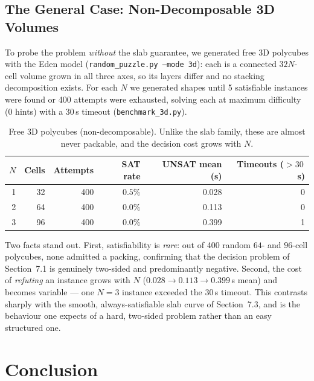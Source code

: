 \documentclass[12pt,a4paper]{article}
\begin{document}
\subsection{The General Case: Non-Decomposable 3D Volumes}

To probe the problem \emph{without} the slab guarantee, we generated free 3D
polycubes with the Eden model (\texttt{random\_puzzle.py --mode 3d}): each is a
connected $32N$-cell volume grown in all three axes, so its layers differ and no
stacking decomposition exists.  For each $N$ we generated shapes until 5
satisfiable instances were found or 400 attempts were exhausted, solving each at
maximum difficulty (0 hints) with a 30\,s timeout
(\texttt{benchmark\_3d.py}).

\begin{table}[H]
\centering
\caption{Free 3D polycubes (non-decomposable). Unlike the slab family, these
         are almost never packable, and the decision cost grows with $N$.}
\label{tab:bench3d}
\renewcommand{\arraystretch}{1.25}
\begin{tabular}{@{}rrrrrr@{}}
  \toprule
  $N$ & \textbf{Cells} & \textbf{Attempts} & \textbf{SAT rate} &
  \textbf{UNSAT mean (s)} & \textbf{Timeouts ($>30$\,s)} \\
  \midrule
  1 &  32 & 400 & $0.5\%$ & 0.028 & 0 \\
  2 &  64 & 400 & $0.0\%$ & 0.113 & 0 \\
  3 &  96 & 400 & $0.0\%$ & 0.399 & 1 \\
  \bottomrule
\end{tabular}
\end{table}

Two facts stand out.  First, satisfiability is \emph{rare}: out of 400 random
$64$- and $96$-cell polycubes, none admitted a packing, confirming that the
decision problem of Section~7.1 is genuinely two-sided and predominantly
negative.  Second, the cost of \emph{refuting} an instance grows with $N$
($0.028 \to 0.113 \to 0.399$\,s mean) and becomes variable --- one $N=3$
instance exceeded the 30\,s timeout.  This contrasts sharply with the smooth,
always-satisfiable slab curve of Section~7.3, and is the behaviour one expects
of a hard, two-sided problem rather than an easy structured one.

\section{Conclusion}
\end{document}
